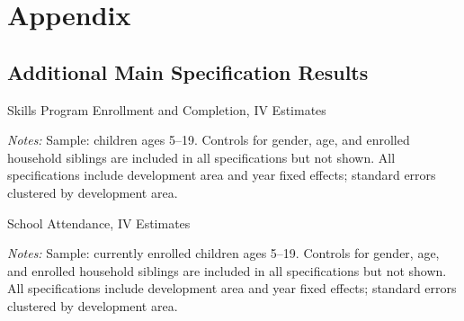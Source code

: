 \documentclass[12pt]{article}
\newcommand*{\TableLagOnePath}{../Paper_3_Tables/Lagged_1Year_Tables}
\begin{document}
	\newpage

	\printbibliography


	\newpage
	\section{Appendix}
	\label{section:appendix}

	\subsection{Additional Main Specification Results}
	\label{subsec:app_main_results}
  \begin{table}[H]
		\centering
		\begin{adjustbox}{max width=\linewidth, center}
		\begin{threeparttable}
			\caption{Skills Program Enrollment and Completion, IV Estimates}
			\label{tab:skills}
			{\small}
			\begin{tablenotes}
				\small
				\item \textit{Notes:} Sample: children ages 5--19. Controls for gender, age, and enrolled household siblings are included in all specifications but not shown. All specifications include development area and year fixed effects; standard errors clustered by development area.
			\end{tablenotes}
		\end{threeparttable}
		\end{adjustbox}
	\end{table}

		\begin{table}[H]
		\centering
		\begin{adjustbox}{max width=\linewidth, center}
		\begin{threeparttable}
			\caption{School Attendance, IV Estimates}
			\label{tab:attendance_levels}
			{\small}
			\begin{tablenotes}
				\small
				\item \textit{Notes:} Sample: currently enrolled children ages 5--19. Controls for gender, age, and enrolled household siblings are included in all specifications but not shown. All specifications include development area and year fixed effects; standard errors clustered by development area.
			\end{tablenotes}
		\end{threeparttable}
		\end{adjustbox}
	\end{table}
\end{document}

